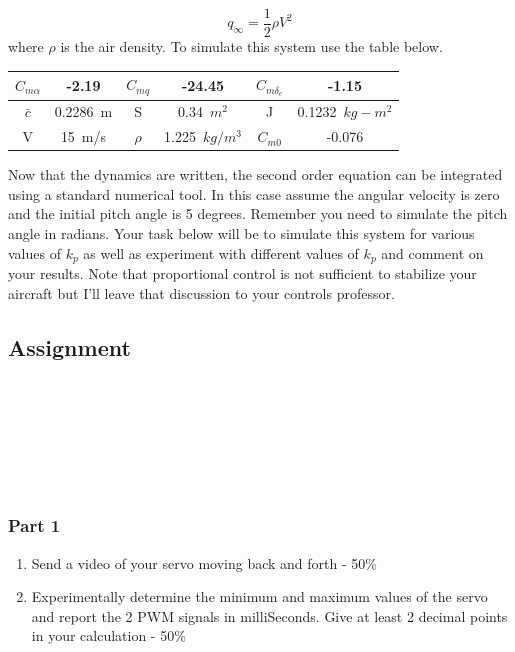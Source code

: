 \begin{equation}
q_{\infty} = \frac{1}{2}\rho V^2
\end{equation}
where $\rho$ is the air density. To simulate this system use the table below.
\begin{table}[H]
\begin{center}
\begin{tabular}{c|c|c|c|c|c}
$C_{m\alpha}$ & -2.19 & $C_{mq}$ & -24.45 & $C_{m\delta_e}$ & -1.15 \\
\hline
$\bar{c}$ & 0.2286~m & S & 0.34~$m^2$ & J & 0.1232~$kg-m^2$ \\
\hline
V & 15~m/s & $\rho$ & 1.225~$kg/m^3$ & $C_{m0}$ & -0.076 \\
\end{tabular}
\end{center}
\end{table}
Now that the dynamics are written, the second order equation can be integrated using a standard numerical tool. In this case assume the angular velocity is zero and the initial pitch angle is 5 degrees. Remember you need to simulate the pitch angle in radians. Your task below will be to simulate this system for various values of $k_p$ as well as experiment with different values of $k_p$ and comment on your results. Note that proportional control is not sufficient to stabilize your aircraft but I’ll leave that discussion to your controls professor. 

\subsection{Assignment}


\ \\
\ \\
\ \\
\ \\

\ \\
\subsubsection{Part 1}
\begin{enumerate}[itemsep=-5pt]
\item Send a video of your servo moving back and forth - 50\%
\item Experimentally determine the minimum and maximum values of the servo and report the 2 PWM signals in milliSeconds. Give at least 2 decimal points in your calculation - 50\%
\end{enumerate}
